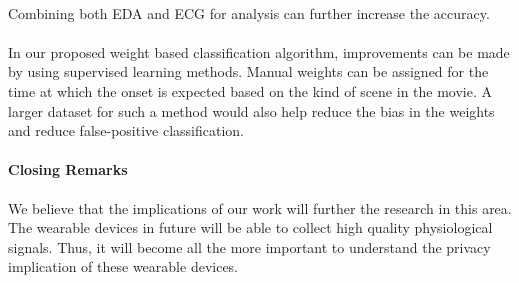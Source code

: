 \paragraph{} Combining both EDA and ECG for analysis can further increase the accuracy.

\paragraph{} In our proposed weight based classification algorithm, improvements can be made by using supervised learning methods. Manual weights can be assigned for the time at which the onset is expected based on the kind of scene in the movie. A larger dataset for such a method would also help reduce the bias in the weights and reduce false-positive classification.

\paragraph{Closing Remarks} We believe that the implications of our work will further the research in this area. The wearable devices in future will be able to collect high quality physiological signals. Thus, it will become all the more important to understand the privacy implication of these wearable devices. 
